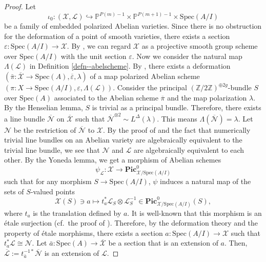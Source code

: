 \documentclass[12pt,twoside]{amsart}
\theoremstyle{definition}
\begin{document}
\begin{proof}
    Let 
    $$\iota_0\colon(\mathcal{X},\mathcal{L})\hookrightarrow \mathbb{P}^{P(m)-1}\times\mathbb{P}^{P(m+1)-1}\times \mathrm{Spec}(A/I)$$
     be a family of embedded polarized Abelian varieties.
    Since there is no obstruction for the deformation of a point of smooth varieties, there exists a section $\varepsilon\colon \mathrm{Spec}(A/I)\to \mathcal{X}$. 
    By \cite[Proposition 6.15]{GIT}, we can regard $\mathcal{X}$ as a projective smooth group scheme over $\mathrm{Spec}(A/I)$ with the unit section $\varepsilon$. 
    Now we consider the natural map $\Lambda(\mathcal{L})$ in Definition \ref{defn--abelscheme}.
    By \cite[Proposition 2.2.4.4]{Lan}, there exists a deformation $(\bar{\pi}\colon \overline{\mathcal{X}}\to \mathrm{Spec}(A),\overline{\varepsilon},\lambda)$ of a map polarized Abelian scheme $(\pi\colon X\to \mathrm{Spec}(A/I),\varepsilon,\Lambda(\mathcal{L}))$.
    Consider the principal $(\mathbb{Z}/2\mathbb{Z})^{\oplus 2g}$-bundle $S$ over $\mathrm{Spec}(A)$ associated to the Abelian scheme $\overline{\pi}$ and the map polarization $\lambda$.
    By the Henselian lemma, $S$ is trivial as a principal bundle.
    Therefore, there exists a line bundle $\overline{\mathcal{N}}$ on $\overline{\mathcal{X}}$ such that $\overline{\mathcal{N}}^{\otimes 2}\sim L^\Delta(\lambda)$.
    This means $\Lambda(\overline{\mathcal{N}})=\lambda$.
    Let $\mathcal{N}$ be the restriction of $\overline{\mathcal{N}}$ to $\mathcal{X}$.
    By the proof of \cite[Proposition 6.10]{GIT} and the fact that numerically trivial line bundles on an Abelian variety are algebraically equivalent to the trivial line bundle, we see that $\mathcal{N}$ and $\mathcal{L}$ are algebraically equivalent to each other.
    By the Yoneda lemma, we get a morphism of Abelian schemes
    \[
    \psi_{\mathcal{L}}\colon \mathcal{X}\to \mathbf{Pic}^0_{\mathcal{X}/\mathrm{Spec}(A/I)}
    \]
    such that for any morphism $S\to \mathrm{Spec}(A/I)$, $\psi$ induces a natural map of the sets of $S$-valued points
    \[
    \mathcal{X}(S)\ni a\longmapsto t_a^*\mathcal{L}_S\otimes\mathcal{L}_S^{-1}\in\mathbf{Pic}^0_{\mathcal{X}/\mathrm{Spec}(A/I)}(S),
    \]
    where $t_a$ is the translation defined by $a$.
    It is well-known that this morphism is an \'etale surjection (cf.~the proof of \cite[Lemma 6.2]{Hat23}).
    Therefore, by the deformation theory and the property of \'etale morphisms, there exists a section $a\colon \mathrm{Spec}(A/I)\to \mathcal{X}$ such that $t_a^*\mathcal{L}\cong\mathcal{N}$.
    Let $\bar{a}\colon \mathrm{Spec}(A)\to \overline{\mathcal{X}}$ be a section that is an extension of $a$.
    Then, $\overline{\mathcal{L}}:=t_{\bar{a}}^{-1*}\overline{\mathcal{N}}$ is an extension of $\mathcal{L}$.


\end{proof}
\end{document}
